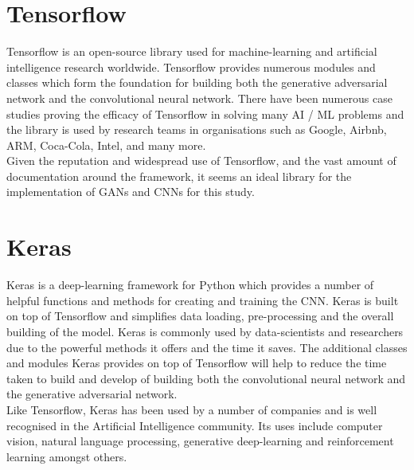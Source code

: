 \section{Tensorflow}
Tensorflow is an open-source library used for machine-learning and artificial intelligence research worldwide\cite{tensorflow}.  Tensorflow provides numerous modules and classes which form the foundation for building both the generative adversarial network and the convolutional neural network. There have been numerous case studies proving the efficacy of Tensorflow in solving many AI / ML problems and the library is used by research teams in organisations such as Google, Airbnb, ARM, Coca-Cola, Intel, and many more\cite{tensorflowCaseStudies}.  
\\
Given the reputation and widespread use of Tensorflow, and the vast amount of documentation around the framework, it seems  an ideal library for the implementation of GANs and CNNs for this study.
\section{Keras}
Keras is a deep-learning framework for Python which provides a number of helpful functions and methods for creating and training the CNN\cite{keras}. Keras is built on top of Tensorflow and simplifies data loading, pre-processing and the overall building of the model.  Keras is commonly used by data-scientists and researchers due to the powerful methods it offers and the time it saves.  The additional classes and modules Keras provides on top of Tensorflow will help to reduce the time taken to build and develop of building both the convolutional neural network and the generative adversarial network.  
\\
Like Tensorflow, Keras has been used by a number of companies and is well recognised in the Artificial Intelligence community.  Its uses include computer vision, natural language processing, generative deep-learning and reinforcement learning amongst others\cite{kerasExamples}.
